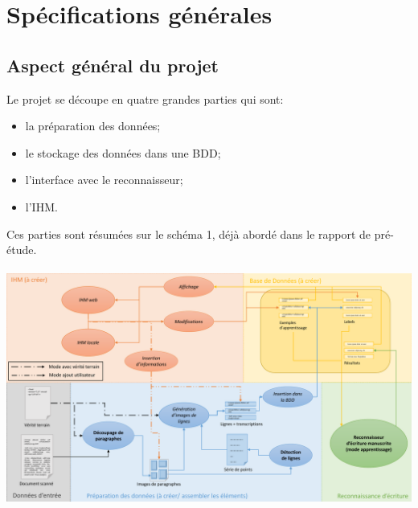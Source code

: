 \section{Spécifications générales}

\subsection{Aspect général du projet}

Le projet se découpe en quatre grandes parties qui sont:

\begin{itemize}
	\item la préparation des données;
	\item le stockage des données dans une BDD;
	\item l'interface avec le reconnaisseur;
	\item l'IHM.
\end{itemize}

Ces parties sont résumées sur le schéma 1, déjà abordé dans le rapport de pré-étude.

\paragraph{}

\begin{mdframed}[frametitle={Figure 1 : Décomposition du projet (mode apprentissage)}, innerbottommargin=10]
\begin{center}
\includegraphics[width=\linewidth]{schema_mode1.1.pdf}
\end{center}
\end{mdframed}

\paragraph{}


